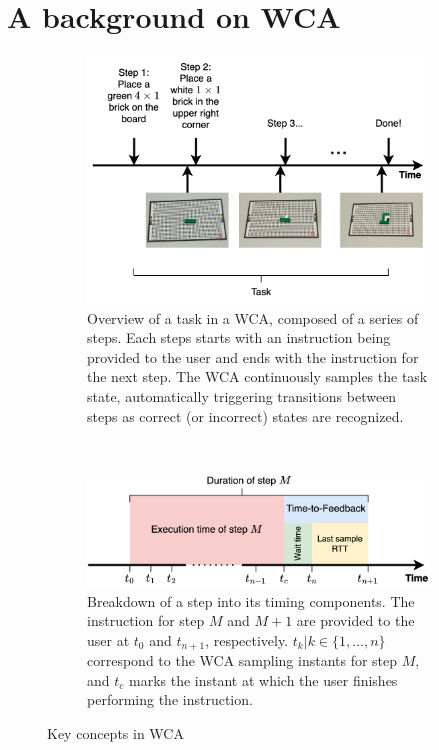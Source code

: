 \section{A background on \acs*{WCA}}\label{sec:background}

\begin{figure}
    \centering
    \begin{subfigure}{\columnwidth}
        \centering
        \includegraphics[width=\columnwidth]{figs/task.png}
        \caption{%
            Overview of a task in a \ac{WCA}, composed of a series of steps.
            Each steps starts with an instruction being provided to the user and ends with the instruction for the next step.
            The \ac{WCA} continuously samples the task state, automatically triggering transitions between steps as correct (or incorrect) states are recognized.
        }\label{fig:task}
    \end{subfigure}\\
    \begin{subfigure}{\columnwidth}
        \centering
        \includegraphics[width=\columnwidth]{figs/step_time.png}
        \caption{%
            Breakdown of a step into its timing components.
            The instruction for step \( M \) and \( M + 1 \) are provided to the user at \( t_0 \) and \( t_{n+1} \), respectively.
            \( t_k | k \in \{1, \ldots, n \} \) correspond to the \ac{WCA} sampling instants for step \( M \), and \( t_c \) marks the instant at which the user finishes performing the instruction.
        }\label{fig:step}
    \end{subfigure}
    \caption{Key concepts in \acl{WCA}}
\end{figure}

